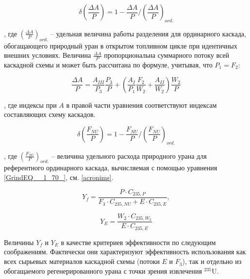 \begin{equation} \label{DeltaA} 
    \delta(\frac{\Delta A}{P})=1-\frac{\Delta A}{P}/(\frac{\Delta A}{P})_{ord.}
\end{equation}

, где $(\frac{\Delta A}{P})_{ord.}$ -- удельная величина работы разделения для ординарного каскада, обогащающего природный уран в открытом топливном цикле при идентичных внешних условиях. Величина $\frac{\Delta A}{P}$ пропорциональна суммарного потоку всей каскадной схемы и может быть рассчитана по формуле, учитывая, что ${P_1}={F_2}$:

\begin{equation} \label{DeltaAP}
  \frac{\Delta A}{P} = \frac{A_{III}}{P_3} \frac{P_3}{P}+\left(\frac{A_I}{P_1} \frac{F_2}{W_2}+\frac{A_{II}}{W_2}\right) \frac{W_2}{P}
\end{equation}

, где индексы при $A$ в правой части уравнения соответствуют индексам составляющих схему каскадов.

\begin{equation} \label{DeltaFnu} 
\delta(\frac{F_{NU}}{P})=1-\frac{F_{NU}}{P}/(\frac{F_{NU}}{P})_{ord.}
\end{equation} 

, где $(\frac{F_{NU}}{P})_{ord.}$ -- величина удельного расхода природного урана для референтного ординарного каскада, вычисляемая с помощью уравнения \ref{GrindEQ__1_70_}, см. \ref{acronims}.

\begin{equation} \label{Rec2} 
    Y_f = \frac{P \cdot C_{235,P}}{F_3 \cdot C_{235,NU} + E \cdot C_{235,E}}, 
\end{equation} 

\begin{equation} \label{RecR2} 
    Y_{E} = \frac{W_2\cdot C_{235,W_2}}{E \cdot C_{235,E}}        
\end{equation} 

Величины $Y_f$ и $Y_{E}$ в качестве критериев эффективности по следующим соображениям. Фактически они характеризуют эффективность использования как всех сырьевых материалов каскадной схемы (потоки $E$ и $F_3$), так и отдельно из обогащаемого регенерированного урана с точки зрения извлечения $^{235}$U.

